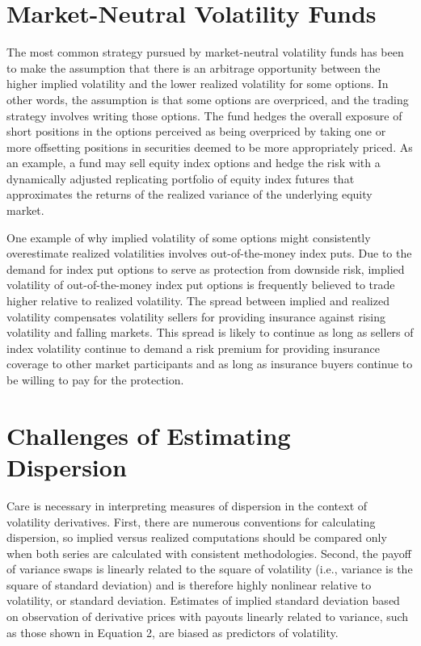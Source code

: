 \documentclass[11pt]{article}
\begin{document}
\section*{Market-Neutral Volatility Funds}
The most common strategy pursued by market-neutral volatility funds has been to make the assumption that there is an arbitrage opportunity between the higher implied volatility and the lower realized volatility for some options. In other words, the assumption is that some options are overpriced, and the trading strategy involves writing those options. The fund hedges the overall exposure of short positions in the options perceived as being overpriced by taking one or more offsetting positions in securities deemed to be more appropriately priced. As an example, a fund may sell equity index options and hedge the risk with a dynamically adjusted replicating portfolio of equity index futures that approximates the returns of the realized variance of the underlying equity market.

One example of why implied volatility of some options might consistently overestimate realized volatilities involves out-of-the-money index puts. Due to the demand for index put options to serve as protection from downside risk, implied volatility of out-of-the-money index put options is frequently believed to trade higher relative to realized volatility. The spread between implied and realized volatility compensates volatility sellers for providing insurance against rising volatility and falling markets. This spread is likely to continue as long as sellers of index volatility continue to demand a risk premium for providing insurance coverage to other market participants and as long as insurance buyers continue to be willing to pay for the protection.

\section*{Challenges of Estimating Dispersion}
Care is necessary in interpreting measures of dispersion in the context of volatility derivatives. First, there are numerous conventions for calculating dispersion, so implied versus realized computations should be compared only when both series are calculated with consistent methodologies. Second, the payoff of variance swaps is linearly related to the square of volatility (i.e., variance is the square of standard deviation) and is therefore highly nonlinear relative to volatility, or standard deviation. Estimates of implied standard deviation based on observation of derivative prices with payouts linearly related to variance, such as those shown in Equation 2, are biased as predictors of volatility.
\end{document}
